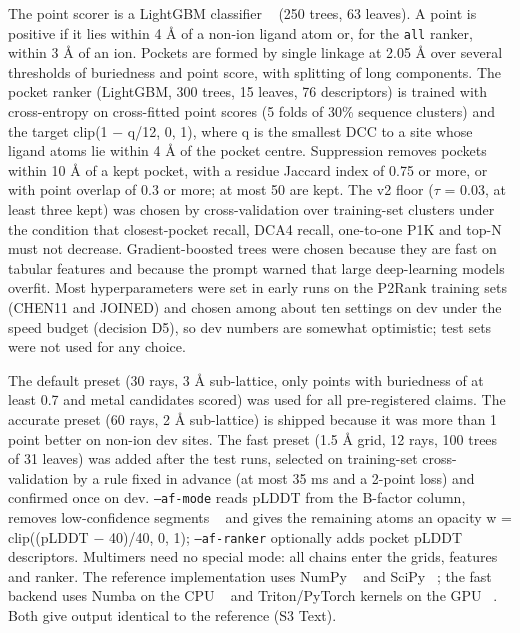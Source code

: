 \documentclass[10pt,letterpaper]{article}
\begin{document}
The point scorer is a LightGBM classifier ~\cite{ke2017} (250 trees, 63 leaves). A point is positive if it lies within 4 \AA{} of a non-ion ligand atom or, for the \texttt{all} ranker, within 3 \AA{} of an ion. Pockets are formed by single linkage at 2.05 \AA{} over several thresholds of buriedness and point score, with splitting of long components. The pocket ranker (LightGBM, 300 trees, 15 leaves, 76 descriptors) is trained with cross-entropy on cross-fitted point scores (5 folds of 30\% sequence clusters) and the target clip(1 $-$ q/12, 0, 1), where q is the smallest DCC to a site whose ligand atoms lie within 4 \AA{} of the pocket centre. Suppression removes pockets within 10 \AA{} of a kept pocket, with a residue Jaccard index of 0.75 or more, or with point overlap of 0.3 or more; at most 50 are kept. The v2 floor ($\tau$ = 0.03, at least three kept) was chosen by cross-validation over training-set clusters under the condition that closest-pocket recall, DCA4 recall, one-to-one P1K and top-N must not decrease. Gradient-boosted trees were chosen because they are fast on tabular features and because the prompt warned that large deep-learning models overfit. Most hyperparameters were set in early runs on the P2Rank training sets (CHEN11 and JOINED) and chosen among about ten settings on dev under the speed budget (decision D5), so dev numbers are somewhat optimistic; test sets were not used for any choice.

The default preset (30 rays, 3 \AA{} sub-lattice, only points with buriedness of at least 0.7 and metal candidates scored) was used for all pre-registered claims. The accurate preset (60 rays, 2 \AA{} sub-lattice) is shipped because it was more than 1 point better on non-ion dev sites. The fast preset (1.5 \AA{} grid, 12 rays, 100 trees of 31 leaves) was added after the test runs, selected on training-set cross-validation by a rule fixed in advance (at most 35 ms and a 2-point loss) and confirmed once on dev. \texttt{--af-mode} reads pLDDT from the B-factor column, removes low-confidence segments ~\cite{gazizov2026} and gives the remaining atoms an opacity w = clip((pLDDT $-$ 40)/40, 0, 1); \texttt{--af-ranker} optionally adds pocket pLDDT descriptors. Multimers need no special mode: all chains enter the grids, features and ranker. The reference implementation uses NumPy ~\cite{harris2020} and SciPy ~\cite{virtanen2020}; the fast backend uses Numba on the CPU ~\cite{lam2015} and Triton/PyTorch kernels on the GPU ~\cite{tillet2019,paszke2019}. Both give output identical to the reference (S3 Text).
\end{document}
